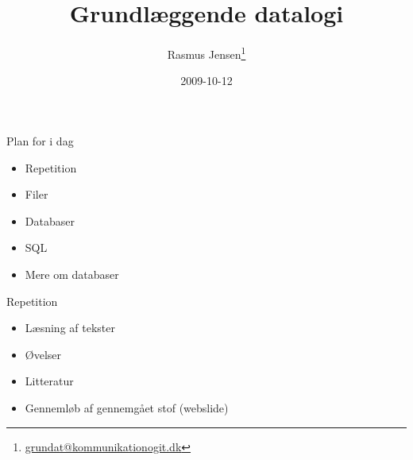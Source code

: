 \documentclass[a4paper,landscape]{slides}
\title{Grundlæggende datalogi}
\author{Rasmus Jensen\footnote{\url{grundat@kommunikationogit.dk}}}
\date{2009-10-12}
\begin{document}
\maketitle

\begin{comment}
- Opsamling
    - repetition
        - Indlæsning af tekst...
    - afleveringsopgave
- Tilstand, udgangspunkt i cgi
- Relationelle Databaser
    - DBMS - Database Management Systems
    - Eksempler på DBMS'er: PostgreSQL, MySQL, SQLite, Oracle, ...
    - Tabeller, forespørgsler, nøgler
    - Database, SQL, abstraktion
    - Scaleability
- SQL NB: ref fra sqlite
    - Standardiseret sprog, variationer mellem databaser
    - SELECT col1, col2, ... coln FROM tablename WHERE condition
    - INSERT INTO tablename (col1, col2, ..., coln) VALUES ( val1, val2,  ..., valn)
    - UPDATE tablename SET col1=val1, ... coln=valn WHERE condition
    - CREATE TABLE tablename (field type, ...)
    - DELETE tablename WHERE condition
    - DROP TABLE tablename 
    - Column modifiers: NOT NULL, PRIMARY KEY, KEY, UNIQ
    - Data types: INT, FLOAT, VARCHAR(n), DATE, ...

- Relationelle Databaser - hvordan virker de
    - Tabeller og indeks
    - Reminder binær søgning
    - Query optimiser


\end{comment}

\begin{slide}
	\begin{center} {\large 
            Plan for i dag
	} \end{center}
	\begin{itemize} \addtolength{\itemsep}{-\baselineskip}
		\item Repetition
		\item Filer
		\item Databaser
		\item SQL
		\item Mere om databaser
	\end{itemize}
\end{slide}

\begin{slide}
	\begin{center} {\large 
            Repetition
	} \end{center}
	\begin{itemize} \addtolength{\itemsep}{-\baselineskip}
                \item Læsning af tekster
                \item Øvelser
                \item Litteratur
		\item Gennemløb af gennemgået stof (webslide)
	\end{itemize}
\end{slide}
\end{document}

